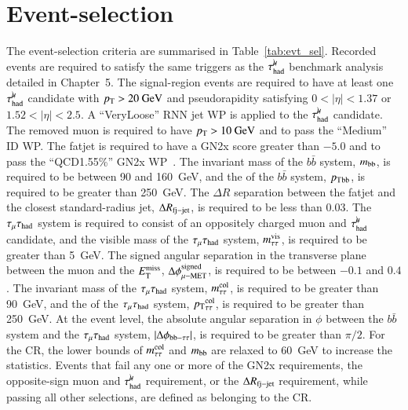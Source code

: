 \section{Event-selection}
    \label{sec:grav:sel}
    
    
    The event-selection criteria are summarised in Table~\ref{tab:evt_sel}. 
    Recorded events are required to satisfy the same triggers as the $\tau_\mathrm{had}^{\mu\mkern-10mu\backslash}$ benchmark analysis detailed in Chapter~5.
    The signal-region events are required to have at least one $\tau_\mathrm{had}^{\mu\mkern-10mu\backslash}$ candidate with 
    $p_{\text{T}} > 20~\text{GeV}$ and pseudorapidity satisfying $0 < |\eta| < 1.37$ or $1.52 < |\eta| < 2.5$. 
    A ``VeryLoose'' RNN jet WP is applied to the $\tau_\mathrm{had}^{\mu\mkern-10mu\backslash}$ candidate. 
    The removed muon is required to have $p_{\text{T}} > 10~\text{GeV}$ and to pass the ``Medium'' ID WP.
    The fatjet is required to have a GN2x score greater than $-5.0$ and to pass the ``QCD1.55\%'' GN2x WP~\cite{ATL-PHYS-PUB-2023-021}. 
    The invariant mass of the $b\bar{b}$ system, $m_\mathrm{bb}$, is required to be between 90 and 160~GeV, 
    and the \pt of the $b\bar{b}$ system, $p_{\text{T}}{}_\mathrm{bb}$, is required to be greater than 250~GeV. 
    The $\Delta{R}$ separation between the fatjet and the closest standard-radius jet, $\Delta R_\mathrm{fj-jet}$, is required to be less than 0.03.
    The $\tau_\mathrm{\mu}\tau_\mathrm{had}$ system is required to consist of an oppositely charged muon and $\tau_\mathrm{had}^{\mu\mkern-10mu\backslash}$ candidate, 
    and the visible mass of the $\tau_\mathrm{\mu}\tau_\mathrm{had}$ system, $m_\mathrm{\tau\tau}^\mathrm{vis}$, is required to be greater than 5~GeV. 
    The signed angular separation in the transverse plane between the muon and the $E_{\text{T}}^{\text{miss}}$, $\Delta\phi^\mathrm{signed}_\mathrm{\mu-MET}$, 
    is required to be between $-0.1$ and $0.4$. 
    The invariant mass of the $\tau_\mathrm{\mu}\tau_\mathrm{had}$ system, $m_\mathrm{\tau\tau}^\mathrm{col}$, is required to be greater than 90~GeV, 
    and the \pt of the $\tau_\mathrm{\mu}\tau_\mathrm{had}$ system, $p_{\text{T}}{}_\mathrm{\tau\tau}^\mathrm{col}$, is required to be greater than 250~GeV.
    At the event level, the absolute angular separation in $\phi$ between the $b\bar{b}$ system and the $\tau_\mathrm{\mu}\tau_\mathrm{had}$ system, 
    $|\Delta\phi_\mathrm{bb-\tau\tau}|$, is required to be greater than $\pi/2$. 
    For the CR, the lower bounds of $m_\mathrm{\tau\tau}^\mathrm{col}$ and $m_\mathrm{bb}$ are relaxed to 60~GeV to increase the statistics. 
    Events that fail any one or more of the GN2x requirements, 
    the opposite-sign muon and $\tau_\mathrm{had}^{\mu\mkern-10mu\backslash}$ requirement, 
    or the $\Delta R_\mathrm{fj-jet}$ requirement, while passing all other selections, 
    are defined as belonging to the CR. 

